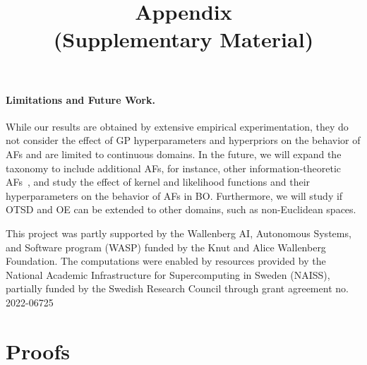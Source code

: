 \documentclass[accepted]{uai2025}
\begin{document}
\paragraph{Limitations and Future Work.}
While our results are obtained by extensive empirical experimentation, they do not consider the effect of \ac{GP} hyperparameters and hyperpriors on the behavior of \acp{AF} and are limited to continuous domains.
In the future, we will expand the taxonomy to include additional \acp{AF}, for instance, other information-theoretic \acp{AF}~\citep{hennig2012entropy, hernandez2014predictive, hvarfner2022joint, cheng2025unified}, and study the effect of kernel and likelihood functions and their hyperparameters on the behavior of \acp{AF} in \acl{BO}.
Furthermore, we will study if \ac{OTSD} and \ac{OE} can be extended to other domains, such as non-Euclidean spaces.

\begin{acknowledgements}
    This project was partly supported by the Wallenberg AI, Autonomous Systems, and Software program (WASP) funded by the Knut and Alice Wallenberg Foundation.
    The computations were enabled by resources provided by the National Academic Infrastructure for Supercomputing in Sweden (NAISS), partially funded by the Swedish Research Council through grant agreement no. 2022-06725
\end{acknowledgements}



\newpage

\onecolumn

\title{Appendix\\(Supplementary Material)}
\maketitle

\appendix

\section{Proofs}
\label{sec:proof}
\end{document}
